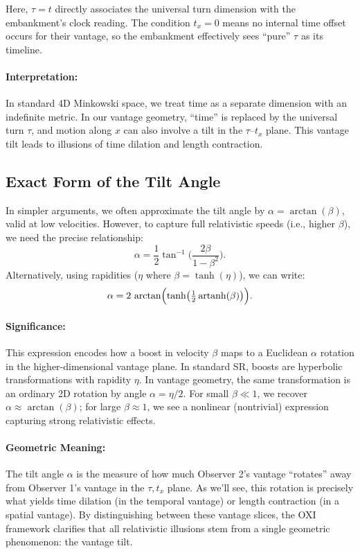 \documentclass{article}
\DeclareMathOperator{\artanh}{artanh}
\begin{document}
Here, \(\tau = t\) directly associates the universal turn dimension with the embankment's clock reading. The condition \(t_x = 0\) means no internal time offset occurs for their vantage, so the embankment effectively sees “pure” \(\tau\) as its timeline.

\paragraph{Interpretation:} In standard 4D Minkowski space, we treat time as a separate dimension with an indefinite metric. In our vantage geometry, “time” is replaced by the universal turn \(\tau\), and motion along \(x\) can also involve a tilt in the \(\tau\)--\(t_x\) plane. This vantage tilt leads to illusions of time dilation and length contraction.

\subsection{Exact Form of the Tilt Angle}

In simpler arguments, we often approximate the tilt angle by \(\alpha = \arctan(\beta)\), valid at low velocities. However, to capture full relativistic speeds (i.e., higher \(\beta\)), we need the precise relationship:
\begin{equation}\label{eq:alpha_exact}
\alpha = \frac{1}{2}\tan^{-1}\!\biggl(\frac{2\beta}{1 - \beta^2}\biggr).
\end{equation}
Alternatively, using rapidities (\(\eta\) where \(\beta = \tanh(\eta)\)), we can write:
\begin{equation}\label{eq:alpha_rapidity}
\alpha = 2\,\arctan\Bigl(\tanh\bigl(\tfrac{1}{2}\artanh(\beta)\bigr)\Bigr).
\end{equation}

\paragraph{Significance:} This expression encodes how a boost in velocity \(\beta\) maps to a Euclidean \(\alpha\) rotation in the higher-dimensional vantage plane. In standard SR, boosts are hyperbolic transformations with rapidity \(\eta\). In vantage geometry, the same transformation is an ordinary 2D rotation by angle \(\alpha = \eta/2\). For small \(\beta\ll1\), we recover \(\alpha\approx\arctan(\beta)\); for large \(\beta\approx1\), we see a nonlinear (nontrivial) expression capturing strong relativistic effects.

\paragraph{Geometric Meaning:} The tilt angle \(\alpha\) is the measure of how much Observer 2’s vantage “rotates” away from Observer 1’s vantage in the \(\tau, t_x\) plane. As we’ll see, this rotation is precisely what yields time dilation (in the temporal vantage) or length contraction (in a spatial vantage). By distinguishing between these vantage slices, the OXI framework clarifies that all relativistic illusions stem from a single geometric phenomenon: the vantage tilt.
\end{document}
